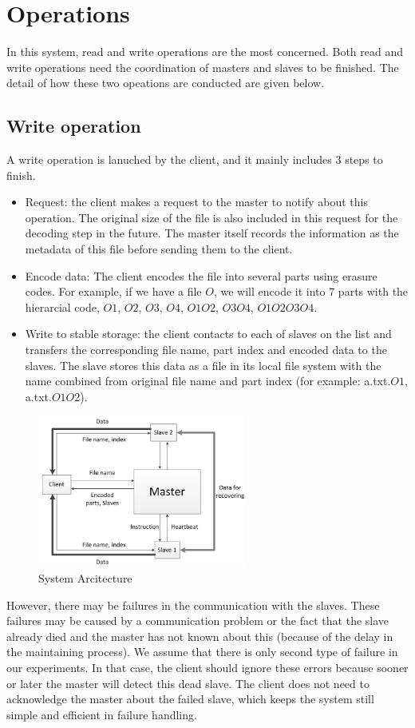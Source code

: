 \documentclass[conference]{IEEEtran}
\begin{document}
\section{Operations}
In this system, read and write operations are the most concerned. Both read and write operations need the coordination of masters and slaves to be finished. The detail of how these two opeations are conducted are given below.
\subsection{Write operation}
A write operation is lanuched by the client, and it mainly includes 3 steps to finish.
\begin{itemize}
\item Request: the client makes a request to the master to notify about this operation. The original size of the file is also included in this request for the decoding step in the future. The master itself records the information as the  metadata  of this file before sending them to the client.
\item Encode data: The client encodes the file into several parts using erasure codes. For example, if we have a file $O$, we will encode it into 7 parts with the hierarcial code, $O1$, $O2$, $O3$, $O4$, $O1O2$, $O3O4$, $O1O2O3O4$.
\item  Write to stable storage: the client contacts to each of slaves on the list and transfers the corresponding file name, part index and encoded data to the slaves. The slave stores this data as a file in its local file system with the name combined from original file name and part index (for example: a.txt.$O1$, a.txt.$O1O2$).
\end{itemize}


\begin{figure}
	\centering
		\includegraphics[height=50mm]{a.jpg}
		\caption{System Arcitecture}
	\label{fig:a}
\end{figure}

However, there may be failures in the communication with the slaves. These failures may be caused by a communication problem or the fact that the slave already died and the master has not known about this (because of the delay in the maintaining process). We assume that there is only second type of failure in our experiments. In that case, the client should ignore these errors because sooner or later the master will detect this dead slave. The client does not need to acknowledge the master about the failed slave, which keeps the system still simple and efficient in failure handling.
\end{document}
